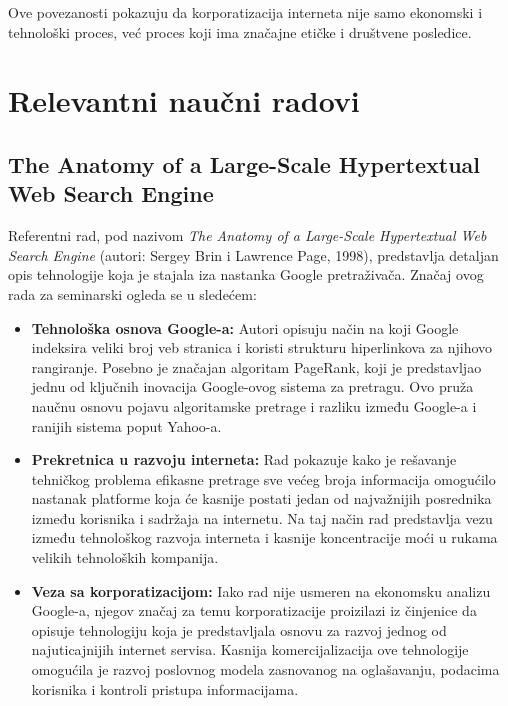 \documentclass[12pt,a4paper]{article}
\begin{document}
Ove povezanosti pokazuju da korporatizacija interneta nije samo ekonomski i
tehnološki proces, već proces koji ima značajne etičke i društvene posledice.
\newpage

\section{Relevantni naučni radovi}

\subsection{The Anatomy of a Large-Scale Hypertextual Web Search Engine}

Referentni rad, pod nazivom \textit{The Anatomy of a Large-Scale Hypertextual Web
Search Engine} (autori: Sergey Brin i Lawrence Page, 1998), predstavlja detaljan
opis tehnologije koja je stajala iza nastanka Google pretraživača. Značaj ovog
rada za seminarski ogleda se u sledećem:

\begin{itemize}

    \item \textbf{Tehnološka osnova Google-a:} Autori opisuju način na koji
    Google indeksira veliki broj veb stranica i koristi strukturu hiperlinkova
    za njihovo rangiranje. Posebno je značajan algoritam PageRank, koji je
    predstavljao jednu od ključnih inovacija Google-ovog sistema za pretragu.
    Ovo pruža naučnu osnovu pojavu algoritamske pretrage i razliku između
    Google-a i ranijih sistema poput Yahoo-a.

    \item \textbf{Prekretnica u razvoju interneta:} Rad pokazuje kako je
    rešavanje tehničkog problema efikasne pretrage sve većeg broja informacija
    omogućilo nastanak platforme koja će kasnije postati jedan od najvažnijih
    posrednika između korisnika i sadržaja na internetu. Na taj način rad
    predstavlja vezu između tehnološkog razvoja interneta i kasnije
    koncentracije moći u rukama velikih tehnoloških kompanija.

    \item \textbf{Veza sa korporatizacijom:} Iako rad nije usmeren na ekonomsku
    analizu Google-a, njegov značaj za temu korporatizacije proizilazi iz
    činjenice da opisuje tehnologiju koja je predstavljala osnovu za razvoj
    jednog od najuticajnijih internet servisa. Kasnija komercijalizacija ove
    tehnologije omogućila je razvoj poslovnog modela zasnovanog na oglašavanju,
    podacima korisnika i kontroli pristupa informacijama.

\end{itemize}
\end{document}
